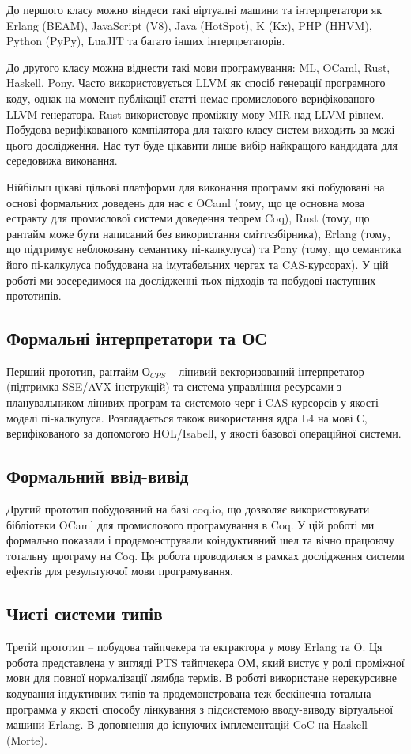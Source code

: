 До першого класу можно віндеси такі віртуалні машини та інтерпретатори як
Erlang (BEAM), JavaScript (V8), Java (HotSpot), K (Kx), PHP (HHVM), Python (PyPy), LuaJIT
та багато інших інтерпретаторів.

До другого класу можна віднести такі мови програмування: ML, OCaml, Rust,
Haskell, Pony. Часто використовується LLVM як спосіб генерації програмного коду,
однак на момент публікації статті немає промислового верифікованого LLVM генератора.
Rust використовує проміжну мову MIR над LLVM рівнем. Побудова верифікованого компілятора
для такого класу систем виходить за межі цього дослідження. Нас тут буде цікавити
лише вибір найкращого кандидата для середовижа виконання.

Нійбільш цікаві цільові платформи для виконання программ
які побудовані на основі формальних доведень для нас є OCaml (тому,
що це основна мова естракту для промислової системи доведення теорем Coq),
Rust (тому, що рантайм може бути написаний без використання сміттєзбірника),
Erlang (тому, що підтримує неблоковану семантику пі-калкулуса)
та Pony (тому, що семантика його пі-калкулуса побудована на імутабельних чергах та CAS-курсорах).
У цій роботі ми зосередимося на дослідженні тьох підходів та побудові наступних прототипів.

\subsection{Формальні інтерпретатори та ОС}
Перший прототип, рантайм $О_{CPS}$ -- лінивий
векторизований інтерпретатор (підтримка SSE/AVX інструкцій) та система
управління ресурсами з планувальником лінивих програм
та системою черг і CAS курсорсів у якості моделі пі-калкулуса. Розглядається також
використання ядра L4 на мові С, верифікованого за допомогою HOL/Isabell,
у якості базової операційної системи.

\subsection{Формальний ввід-вивід}
Другий прототип побудований на базі coq.io, що дозволяє
використовувати бібліотеки OCaml для промислового програмування в Coq.
У цій роботі ми формально показали і продемонстрували коіндуктивний шел
та вічно працюючу тотальну програму на Coq. Ця робота проводилася
в рамках дослідження системи ефектів для результуючої мови програмування.

\subsection{Чисті системи типів}
Третій прототип -- побудова тайпчекера та ектрактора у мову Erlang та O.
Ця робота представлена у вигляді PTS тайпчекера ОМ, який вистує у ролі
проміжної мови для повної нормалізації лямбда термів. В роботі використане
нерекурсивне кодування індуктивних типів та продемонстрована теж бескінечна
тотальна программа у якості способу лінкування з підсистемою вводу-виводу
віртуальної машини Erlang. В доповнення до існуючих імплементацій CoC
на Haskell (Morte).

